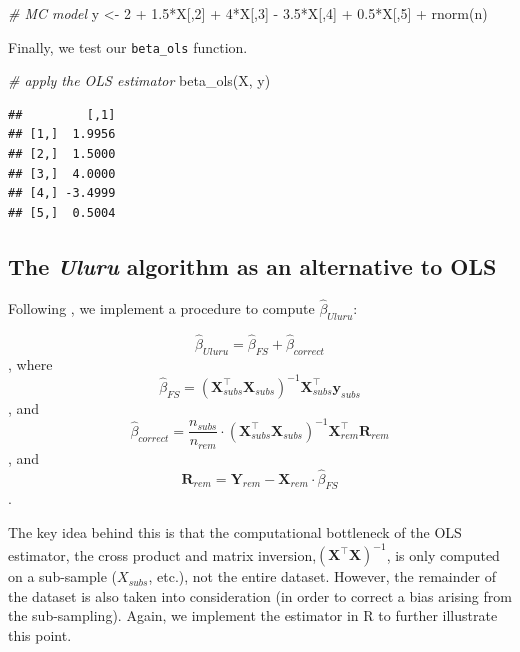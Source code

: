 \documentclass[
  12pt,
]{style/krantz}
\newenvironment{Shaded}{\begin{snugshade}}{\end{snugshade}}
\newcommand{\CommentTok}[1]{\textcolor[rgb]{0.56,0.35,0.01}{\textit{#1}}}
\newcommand{\DecValTok}[1]{\textcolor[rgb]{0.00,0.00,0.81}{#1}}
\newcommand{\FloatTok}[1]{\textcolor[rgb]{0.00,0.00,0.81}{#1}}
\newcommand{\FunctionTok}[1]{\textcolor[rgb]{0.00,0.00,0.00}{#1}}
\newcommand{\NormalTok}[1]{#1}
\newcommand{\OtherTok}[1]{\textcolor[rgb]{0.56,0.35,0.01}{#1}}
\newcommand{\SpecialCharTok}[1]{\textcolor[rgb]{0.00,0.00,0.00}{#1}}
\begin{document}
\begin{Shaded}
\begin{Highlighting}[]
\CommentTok{\# MC model}
\NormalTok{y }\OtherTok{\textless{}{-}} \DecValTok{2} \SpecialCharTok{+} \FloatTok{1.5}\SpecialCharTok{*}\NormalTok{X[,}\DecValTok{2}\NormalTok{] }\SpecialCharTok{+} \DecValTok{4}\SpecialCharTok{*}\NormalTok{X[,}\DecValTok{3}\NormalTok{] }\SpecialCharTok{{-}} \FloatTok{3.5}\SpecialCharTok{*}\NormalTok{X[,}\DecValTok{4}\NormalTok{] }\SpecialCharTok{+} \FloatTok{0.5}\SpecialCharTok{*}\NormalTok{X[,}\DecValTok{5}\NormalTok{] }\SpecialCharTok{+} \FunctionTok{rnorm}\NormalTok{(n)}
\end{Highlighting}
\end{Shaded}

Finally, we test our \texttt{beta\_ols} function.

\begin{Shaded}
\begin{Highlighting}[]
\CommentTok{\# apply the OLS estimator}
\FunctionTok{beta\_ols}\NormalTok{(X, y)}
\end{Highlighting}
\end{Shaded}

\begin{verbatim}
##         [,1]
## [1,]  1.9956
## [2,]  1.5000
## [3,]  4.0000
## [4,] -3.4999
## [5,]  0.5004
\end{verbatim}

\hypertarget{the-uluru-algorithm-as-an-alternative-to-ols}{%
\subsection{\texorpdfstring{The \emph{Uluru} algorithm as an alternative to OLS}{The Uluru algorithm as an alternative to OLS}}\label{the-uluru-algorithm-as-an-alternative-to-ols}}

Following \citet{dhillon_2013}, we implement a procedure to compute \(\hat{\beta}_{Uluru}\):

\[\hat{\beta}_{Uluru}=\hat{\beta}_{FS} + \hat{\beta}_{correct}\], where
\[\hat{\beta}_{FS} = (\mathbf{X}_{subs}^\intercal\mathbf{X}_{subs})^{-1}\mathbf{X}_{subs}^{\intercal}\mathbf{y}_{subs}\], and
\[\hat{\beta}_{correct}= \frac{n_{subs}}{n_{rem}} \cdot (\mathbf{X}_{subs}^\intercal\mathbf{X}_{subs})^{-1} \mathbf{X}_{rem}^{\intercal}\mathbf{R}_{rem}\], and
\[\mathbf{R}_{rem} = \mathbf{Y}_{rem} - \mathbf{X}_{rem}  \cdot \hat{\beta}_{FS}\].

The key idea behind this is that the computational bottleneck of the OLS estimator, the cross product and matrix inversion,\((\mathbf{X}^\intercal\mathbf{X})^{-1}\), is only computed on a sub-sample (\(X_{subs}\), etc.), not the entire dataset. However, the remainder of the dataset is also taken into consideration (in order to correct a bias arising from the sub-sampling). Again, we implement the estimator in R to further illustrate this point.
\end{document}
